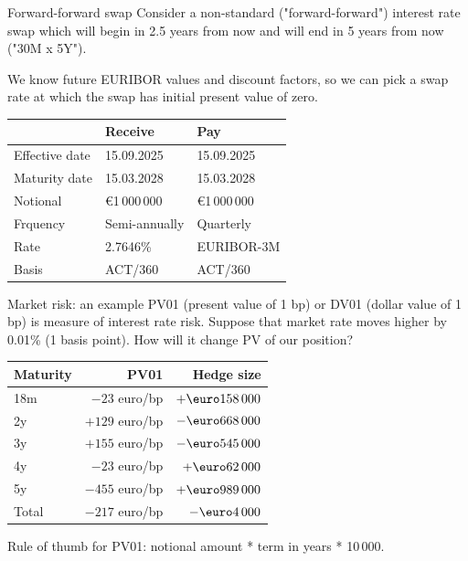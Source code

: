 \documentclass{beamer}
\renewcommand{\EUR}[1]{\textup{\euro}#1}
\begin{document}
\begin{frame}{Forward-forward swap}
\justify
Consider a non-standard ("forward-forward") interest rate swap which will begin in 2.5 years from now and will end in 5 years from now ("30M x 5Y").

\justify
We know future EURIBOR values and discount factors, so we can pick a swap rate at which the swap has initial present value of zero.

\justify
\centering
\begin{tabular}{l|l|l}
& Receive & Pay \\ \hline
Effective date & 15.09.2025 & 15.09.2025 \\ 
Maturity date  & 15.03.2028 & 15.03.2028 \\
Notional       & \EUR{1\,000\,000} & \EUR{1\,000\,000} \\
Frquency       & Semi-annually     & Quarterly \\
Rate           & \alert{2.7646\%}          & EURIBOR-3M   \\
Basis          & ACT/360           & ACT/360
\end{tabular}
\end{frame}



\begin{frame}{Market risk: an example}
\justify
PV01 (present value of 1 bp) or DV01 (dollar value of 1 bp) is measure of interest rate risk. Suppose that market rate moves higher by 0.01\% (1 basis point). How will it change PV of our position?

\justify
\centering
\begin{tabular}{l|r|r}
Maturity  & PV01 & Hedge size \\ \hline
18m   & $-23$  euro/bp & $+\EUR{158\,000}$ \\
2y    & $+129$ euro/bp & $-\EUR{668\,000}$ \\
3y    & $+155$ euro/bp & $-\EUR{545\,000}$ \\
4y    & $-23$  euro/bp & $+\EUR{62\,000}$ \\
5y    & $-455$ euro/bp & $+\EUR{989\,000}$ \\ \hline
Total & $-217$ euro/bp & $-\EUR{4\,000}$
\end{tabular}

\justify
Rule of thumb for PV01: notional amount * term in years * 10\,000.
\end{frame}
\end{document}

